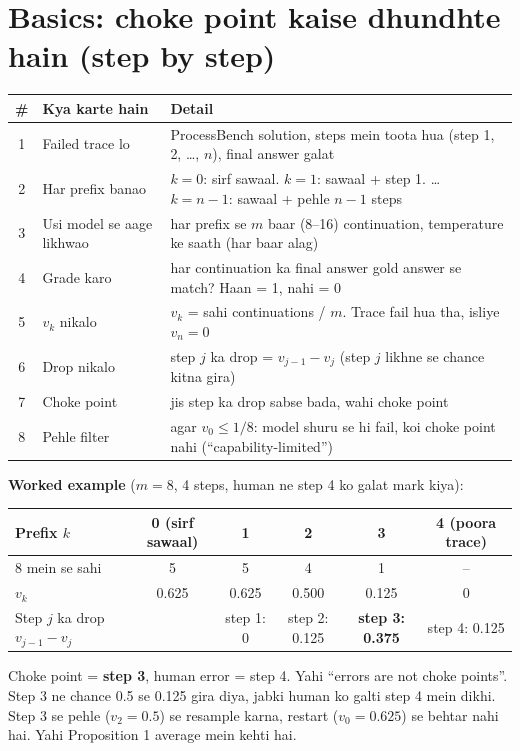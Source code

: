 \documentclass[10pt,a4paper]{article}
\begin{document}
\section{Basics: choke point kaise dhundhte hain (step by step)}
\begin{center}\small
\begin{tabularx}{\textwidth}{clX}
\toprule
\# & Kya karte hain & Detail \\
\midrule
1 & Failed trace lo & ProcessBench solution, steps mein toota hua (step 1, 2, \dots, $n$), final answer galat \\
2 & Har prefix banao & $k=0$: sirf sawaal. $k=1$: sawaal + step 1. \dots\ $k=n-1$: sawaal + pehle $n-1$ steps \\
3 & Usi model se aage likhwao & har prefix se $m$ baar (8--16) continuation, temperature ke saath (har baar alag) \\
4 & Grade karo & har continuation ka final answer gold answer se match? Haan = 1, nahi = 0 \\
5 & $v_k$ nikalo & $v_k$ = sahi continuations / $m$. Trace fail hua tha, isliye $v_n = 0$ \\
6 & Drop nikalo & step $j$ ka drop = $v_{j-1} - v_j$ (step $j$ likhne se chance kitna gira) \\
7 & Choke point & jis step ka drop sabse bada, wahi choke point \\
8 & Pehle filter & agar $v_0 \le 1/8$: model shuru se hi fail, koi choke point nahi (``capability-limited'') \\
\bottomrule
\end{tabularx}
\end{center}
\textbf{Worked example} ($m=8$, 4 steps, human ne step 4 ko galat mark kiya):
\begin{center}\small
\begin{tabular}{lccccc}
\toprule
Prefix $k$ & 0 (sirf sawaal) & 1 & 2 & 3 & 4 (poora trace) \\
\midrule
8 mein se sahi & 5 & 5 & 4 & 1 & -- \\
$v_k$ & 0.625 & 0.625 & 0.500 & 0.125 & 0 \\
Step $j$ ka drop $v_{j-1}-v_j$ & & step 1: 0 & step 2: 0.125 & \textbf{step 3: 0.375} & step 4: 0.125 \\
\bottomrule
\end{tabular}
\end{center}
Choke point = \textbf{step 3}, human error = step 4. Yahi ``errors are not choke points''. Step 3 ne chance
0.5 se 0.125 gira diya, jabki human ko galti step 4 mein dikhi. Step 3 se pehle ($v_2 = 0.5$) se resample karna,
restart ($v_0 = 0.625$) se behtar nahi hai. Yahi Proposition 1 average mein kehti hai.
\end{document}
